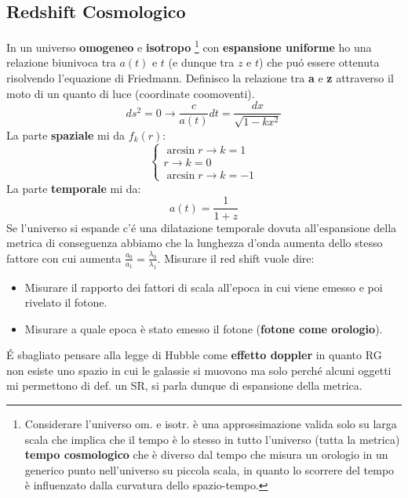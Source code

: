 \documentclass[12pt, a4paper]{article}
\begin{document}
\subsection{Redshift Cosmologico}
In un universo \textbf{omogeneo} e \textbf{isotropo} \footnote{Considerare l'universo om. e isotr. è una approssimazione valida solo su larga scala che implica che il tempo è lo stesso in tutto l'universo (tutta la metrica) \textbf{tempo cosmologico} che è diverso dal tempo che misura un orologio in un generico punto nell'universo su piccola scala, in quanto lo scorrere del tempo è influenzato dalla curvatura dello spazio-tempo.} con \textbf{espansione uniforme} ho una relazione biunivoca tra $a(t)$ e $t$ (e dunque tra $z$ e $t$) che pu\'{o} essere ottenuta risolvendo l'equazione di Friedmann. 
Definisco la relazione tra \textbf{a} e \textbf{z} attraverso il moto di un quanto di luce (coordinate coomoventi).
\begin{equation}
    ds^2=0 \rightarrow \frac{c}{a(t)}dt=\frac{dx}{\sqrt{1-k x^2}}
\end{equation}
La parte \textbf{spaziale} mi da $f_k(r)$:
\begin{equation}
    \begin{cases}
         \arcsin{r} \rightarrow k=1
         \\
         r \rightarrow k=0
         \\
         \arcsin{r} \rightarrow k=-1
    \end{cases}
\end{equation}
La parte \textbf{temporale} mi da:
\begin{equation}
    a(t)=\frac{1}{1+z}
\end{equation}
Se l'universo si espande c'\'{e} una dilatazione temporale dovuta all'espansione della metrica di conseguenza abbiamo che la lunghezza d'onda aumenta dello stesso fattore con cui aumenta $\frac{a_0}{a_1}=\frac{\lambda_0}{\lambda_1}$.
Misurare il red shift vuole dire:
\begin{itemize}
    \item Misurare il rapporto dei fattori di scala all'epoca in cui viene emesso e poi rivelato il fotone.
    \item Misurare a quale epoca è stato emesso il fotone (\textbf{fotone come orologio}).
\end{itemize}
\'{E} sbagliato pensare alla legge di Hubble come \textbf{effetto doppler} in quanto RG non esiste uno spazio in cui le galassie si muovono ma solo perch\'{e} alcuni oggetti mi permettono di def. un SR, si parla dunque di espansione della metrica. 
\end{document}
